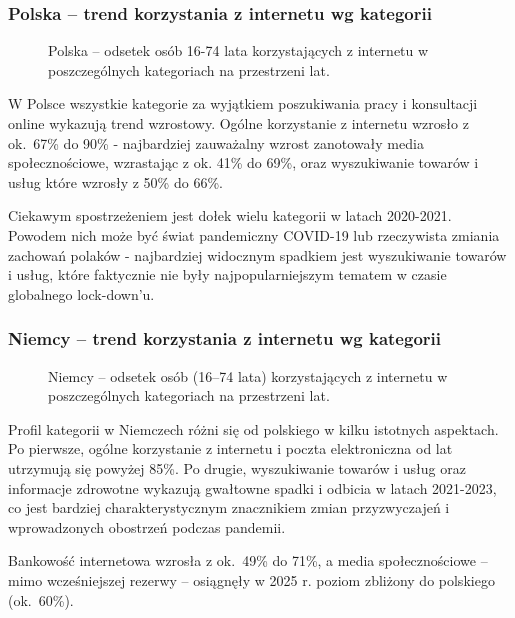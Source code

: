 \documentclass[12pt]{article}
\begin{document}
\newpage




\subsubsection{Polska – trend korzystania z internetu wg kategorii}

\begin{figure}[H]
    
    \caption{Polska – odsetek osób 16-74 lata korzystających z internetu w poszczególnych kategoriach na przestrzeni lat.}
\end{figure}

W Polsce wszystkie kategorie za wyjątkiem poszukiwania pracy i konsultacji online wykazują trend wzrostowy. Ogólne korzystanie z internetu 
wzrosło z ok.~67\% do 90\% - najbardziej zauważalny wzrost zanotowały media społecznościowe, wzrastając z ok. 41\% do 69\%, oraz 
wyszukiwanie towarów i usług które wzrosły z 50\% do 66\%. 

Ciekawym spostrzeżeniem jest dołek wielu kategorii w latach 2020-2021. Powodem nich może być świat pandemiczny COVID-19 lub rzeczywista zmiania 
zachowań polaków - najbardziej widocznym spadkiem jest wyszukiwanie towarów i usług, które faktycznie nie były najpopularniejszym tematem 
w czasie globalnego lock-down'u.




\subsubsection{Niemcy – trend korzystania z internetu wg kategorii}

\begin{figure}[H]
    
    \caption{Niemcy – odsetek osób (16--74 lata) korzystających z internetu w poszczególnych kategoriach na przestrzeni lat.}
\end{figure}

Profil kategorii w Niemczech różni się od polskiego w kilku istotnych aspektach. Po pierwsze, ogólne korzystanie z internetu i poczta elektroniczna
od lat utrzymują się powyżej 85\%. Po drugie, wyszukiwanie towarów i usług oraz informacje zdrowotne wykazują gwałtowne spadki i odbicia w
latach 2021-2023, co jest bardziej charakterystycznym znacznikiem zmian przyzwyczajeń i wprowadzonych obostrzeń podczas pandemii.

Bankowość internetowa wzrosła z ok.~49\% do 71\%, a media społecznościowe – mimo wcześniejszej rezerwy – osiągnęły w 2025 r. 
poziom zbliżony do polskiego (ok.~60\%).
\end{document}
